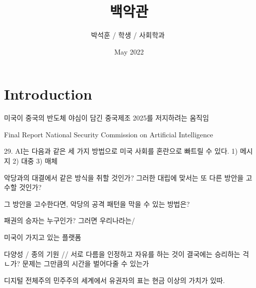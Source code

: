 \documentclass{article}
\title{백악관}
\author{박석훈 / 학생 / 사회학과 ­}
\date{May 2022}
\begin{document}
\maketitle

\section{Introduction}

미국이 중국의 반도체 야심이 담긴 중국제조 2025를 저지하려는 움직임

Final Report National Security Commission on Artificial Intelligence


29. AI는 다음과 같은 세 가지 방법으로 미국 사회를 혼란으로 빠트릴 수 있다. 1) 메시지 2) 대중 3) 매체

악당과의 대결에서 같은 방식을 취할 것인가? 그러한 대립에 맞서는 또 다른 방안을 고수할 것인가?

그 방안을 고수한다면, 악당의 공격 패턴을 막을 수 있는 방법은? 

패권의 승자는 누구인가? 그러면 우리나라는/

미국이 가지고 있는 플랫폼

다양성 / 종의 기원 // 서로 다름을 인정하고 자유를 하는 것이 결국에는 승리하는 걱ㄴ가? 문제는 그만큼의 시간을 벌어다줄 수 있는가

디지털 전체주의
민주주의 세계에서 유권자의 표는 현금 이상의 가치가 있따.
\end{document}

